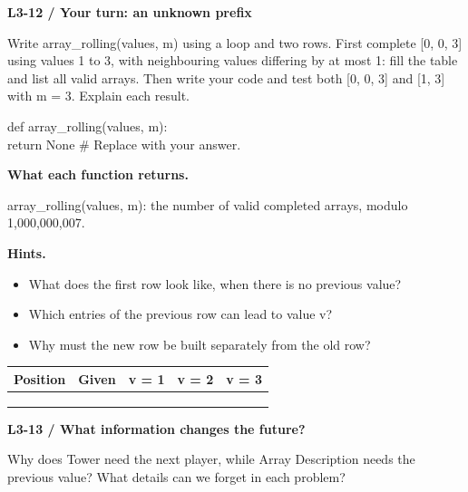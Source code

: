 \documentclass[11pt,a4paper]{article}
\begin{document}
\par\noindent\begin{minipage}{\linewidth}
\textbf{L3-12 / Your turn: an unknown prefix}\par\smallskip Write array\_rolling(values, m) using a loop and two rows. First complete [0, 0, 3] using values 1 to 3, with neighbouring values differing by at most 1: fill the table and list all valid arrays. Then write your code and test both [0, 0, 3] and [1, 3] with m = 3. Explain each result.\par
\par{}\par\smallskip\noindent\colorbox{codepaper}{\parbox{\dimexpr\linewidth-2\fboxsep\relax}{\small\ttfamily\raggedright def array\_rolling(values, m):\\\hspace*{2.4em}return None  \# Replace with your answer.}}\par
{\small\textbf{What each function returns.}\par array\_rolling(values, m): the number of valid completed arrays, modulo 1,000,000,007.\par }
{\small\textbf{Hints.}}\begin{itemize}\item What does the first row look like, when there is no previous value?\item Which entries of the previous row can lead to value v?\item Why must the new row be built separately from the old row?\end{itemize}
\par\medskip \begingroup\small\setlength{\tabcolsep}{4pt}\renewcommand{\arraystretch}{1.35}\begin{tabularx}{\linewidth}{>{\raggedright\arraybackslash}X>{\raggedright\arraybackslash}X>{\raggedright\arraybackslash}X>{\raggedright\arraybackslash}X>{\raggedright\arraybackslash}X}\toprule\textbf{Position} & \textbf{Given} & \textbf{v = 1} & \textbf{v = 2} & \textbf{v = 3}\\\midrule
0 & 0 &  &  & \\
1 & 0 &  &  & \\
2 & 3 &  &  & \\
\bottomrule\end{tabularx}\endgroup\par\medskip 
\end{minipage}\par\vspace{4mm}
\par\noindent\begin{minipage}{\linewidth}
\textbf{L3-13 / What information changes the future?}\par\smallskip Why does Tower need the next player, while Array Description needs the previous value? What details can we forget in each problem?\par
\end{minipage}\par\vspace{4mm}
\end{document}

